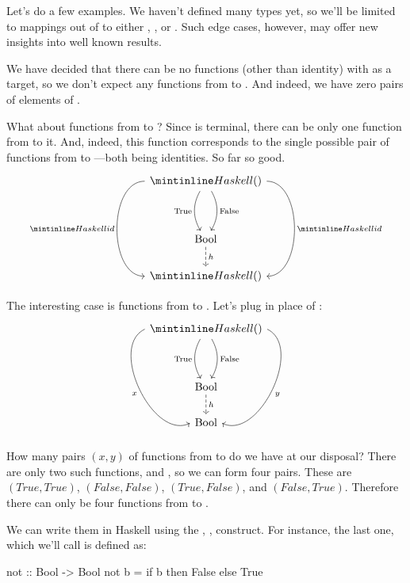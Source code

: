 \documentclass[DaoFP]{subfiles}
\begin{document}
Let's do a few examples. We haven't defined many types yet, so we'll be limited to mappings out of  to either , \hask{()}, or . Such edge cases, however, may offer new insights into well known results.

We have decided that there can be no functions (other than identity) with  as a target, so we don't expect any functions from  to . And indeed, we have zero pairs of elements of . 

What about functions from  to \hask{()}? Since \hask{()} is terminal, there can be only one function from  to it. And, indeed, this function corresponds to the single possible pair of functions from \hask{()} to \hask{()}---both being identities. So far so good.
\[
 \begin{tikzcd}
 \hask{()}
 \arrow[dd, bend right, "\text{True}"']
 \arrow[dd, bend left, "\text{False}"]
  \arrow[ddd, bend right =90, "\hask{id}"']
 \arrow[ddd, bend left=90, "\hask{id}"]
\\
 \\
\text{Bool}
\arrow[d, dashed, "h"]
\\
\hask{()}
 \end{tikzcd}
\]


The interesting case is functions from  to . Let's plug  in place of :
\[
 \begin{tikzcd}
 \hask{()}
 \arrow[dd, bend right, "\text{True}"']
 \arrow[dd, bend left, "\text{False}"]
  \arrow[ddd, bend right =90, "x"']
 \arrow[ddd, bend left=90, "y"]
\\
 \\
\text{Bool}
\arrow[d, dashed, "h"]
\\
\text{Bool}
 \end{tikzcd}
\]
How many pairs $(x, y)$ of functions from \hask{()} to  do we have at our disposal? There are only two such functions,  and , so we can form four pairs. These are $(True, True)$, $(False, False)$, $(True, False)$, and $(False, True)$. Therefore there can only be four functions from  to . 

We can write them in Haskell using the  , ,  construct. For instance, the last one, which we'll call  is defined as:
\begin{haskell}
not :: Bool -> Bool
not b = if b then False else True
\end{haskell}
\end{document}
